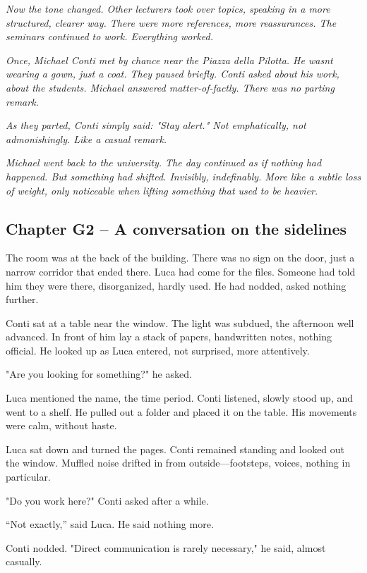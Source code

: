 \documentclass[
]{article}
\begin{document}
\emph{Now the tone changed. Other lecturers took over topics, speaking in a more structured, clearer way. There were more references, more reassurances. The seminars continued to work. Everything worked.}

\emph{Once, Michael Conti met by chance near the Piazza della Pilotta. He wasn\textquotesingle t wearing a gown, just a coat. They paused briefly. Conti asked about his work, about the students. Michael answered matter-of-factly. There was no parting remark.}

\emph{As they parted, Conti simply said: "Stay alert." Not emphatically, not admonishingly. Like a casual remark.}

\emph{Michael went back to the university. The day continued as if nothing had happened. But something had shifted. Invisibly, indefinably. More like a subtle loss of weight, only noticeable when lifting something that used to be heavier.}

\subsection{Chapter G2 -- A conversation on the sidelines}\label{chapter-g2-a-conversation-on-the-sidelines}

The room was at the back of the building. There was no sign on the door, just a narrow corridor that ended there. Luca had come for the files. Someone had told him they were there, disorganized, hardly used. He had nodded, asked nothing further.

Conti sat at a table near the window. The light was subdued, the afternoon well advanced. In front of him lay a stack of papers, handwritten notes, nothing official. He looked up as Luca entered, not surprised, more attentively.

"Are you looking for something?" he asked.

Luca mentioned the name, the time period. Conti listened, slowly stood up, and went to a shelf. He pulled out a folder and placed it on the table. His movements were calm, without haste.

Luca sat down and turned the pages. Conti remained standing and looked out the window. Muffled noise drifted in from outside---footsteps, voices, nothing in particular.

"Do you work here?" Conti asked after a while.

``Not exactly,'' said Luca. He said nothing more.

Conti nodded. "Direct communication is rarely necessary," he said, almost casually.
\end{document}
